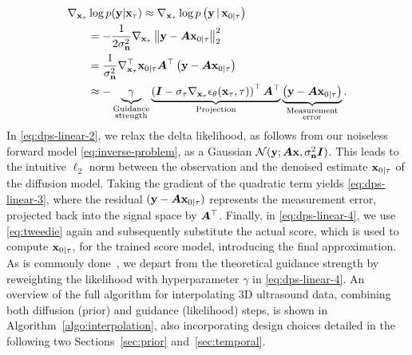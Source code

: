 \documentclass[journal,twoside,web,dvipsnames]{ieeecolor}          %
\newcommand{\tsw}[1]{\textcolor{black}{#1}}
\begin{document}
\begin{align}
    \nabla_{\rvx_\tau} & \log p(\rvy | \rvx_\tau) \approx \nabla_{\rvx_\tau} \log p\left(\rvy \, | \, \rvx_{0\mid\tau} \right) \label{eq:dps-linear-1} \\
    &= -\frac{1}{2\sigma_{\rvn}^2} \nabla_{\rvx_\tau} \norm{\rvy - \mA \rvx_{0\mid\tau}}_2^2 \label{eq:dps-linear-2} \\
    &= \tsw{\frac{1}{\sigma_{\rvn}^2}} \nabla_{\rvx_\tau}^\top \rvx_{0\mid\tau} \mA^\top \left( \rvy - \mA \rvx_{0\mid\tau} \right)\label{eq:dps-linear-3}  \\
    &\approx - \underbrace{\gamma}_{\substack{\text{Guidance}\\\text{strength}}} \underbrace{\left(\mI - \sigma_\tau\nabla_{\rvx_\tau} \rvepsilon_\theta(\rvx_\tau, \tau) \right)^\top
        \mA^\top}_{\text{Projection}}
        \underbrace{\left( \rvy - \mA \rvx_{0\mid\tau} \right)}_{\substack{\text{Measurement}\\\text{error}}}. \label{eq:dps-linear-4}
\end{align}
In \eqref{eq:dps-linear-2}, we relax the delta likelihood, as follows from our noiseless forward model \eqref{eq:inverse-problem}, as a Gaussian $\mathcal{N}({\mathbf{y}}; {\bm{A}} {\mathbf{x}}, \sigma_{{\mathbf{n}}}^2 {\bm{I}})$. This leads to the intuitive $\ell_2$ norm between the observation and the denoised estimate ${\mathbf{x}}_{0\mid\tau}$ of the diffusion model.  Taking the gradient of the quadratic term yields \eqref{eq:dps-linear-3}, where the residual $({\mathbf{y}} - {\bm{A}}{\mathbf{x}}_{0\mid\tau})$ represents the measurement error, projected back into the signal space by ${\bm{A}}^\top$. Finally, in \eqref{eq:dps-linear-4}, we use \eqref{eq:tweedie} again and subsequently substitute the actual score, which is used to compute ${\mathbf{x}}_{0\mid\tau}$, for the trained score model, introducing the final approximation. As is commonly done~\cite{daras2024survey}, we depart from the theoretical guidance strength by reweighting the likelihood with hyperparameter $\gamma$ in \eqref{eq:dps-linear-4}. An overview of the full algorithm for interpolating 3D ultrasound data, combining both diffusion (prior) and guidance (likelihood) steps, is shown in Algorithm~\ref{algo:interpolation}, also incorporating design choices detailed in the following two Sections~\ref{sec:prior} and~\ref{sec:temporal}.


\end{document}
